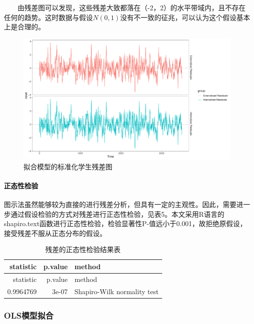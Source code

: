 \documentclass[
]{article}
\begin{document}
  由残差图可以发现，这些残差大致都落在（-2，2）的水平带域内，且不存在任何的趋势。这时数据与假设\(N(0,1)\)没有不一致的征兆，可以认为这个假设基本上是合理的。

\begin{figure}

{\centering \includegraphics{TJRJCP_DuXingx_202105_files/figure-latex/unnamed-chunk-17-1} 

}

\caption{拟合模型的标准化学生残差图}\label{fig:unnamed-chunk-17}
\end{figure}

\hypertarget{ux6b63ux6001ux6027ux68c0ux9a8c}{%
\paragraph{正态性检验}\label{ux6b63ux6001ux6027ux68c0ux9a8c}}

图示法虽然能够较为直接的进行残差分析，但具有一定的主观性。因此，需要进一步通过假设检验的方式对残差进行正态性检验，见表5。本文采用R语言的shapiro.text函数进行正态性检验，检验显著性P-值远小于0.001，故拒绝原假设，接受残差不服从正态分布的假设。

\begin{longtable}[]{@{}rrl@{}}
\caption{残差的正态性检验结果表}\tabularnewline
\toprule
statistic & p.value & method\tabularnewline
\midrule
\endfirsthead
\toprule
statistic & p.value & method\tabularnewline
\midrule
\endhead
0.9964769 & 3e-07 & Shapiro-Wilk normality test\tabularnewline
\bottomrule
\end{longtable}

\hypertarget{olsux6a21ux578bux62dfux5408}{%
\subsubsection{OLS模型拟合}\label{olsux6a21ux578bux62dfux5408}}
\end{document}
